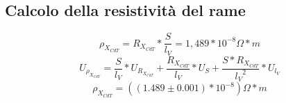 \documentclass[a4paper]{article}
\begin{document}
\subsection{Calcolo della resistività del rame}
\begin{Large} 
	\begin{equation}
		\rho_{X_{CdT}} = R_{X_{CdT}}*\frac{S}{l_V} = 1,489*10^{-8} \Omega*m
	 \end{equation}
	 \begin{equation}
		U_{\rho_{X_{CdT}}} = \frac{S}{l_V}*U_{R_{X_{CdT}}}+\frac{R_{X_{CdT}}}{l_V}*U_S+\frac{S*R_{X_{CdT}}}{{l_V}^2}*U_{l_V}
	 \end{equation}
	 \begin{equation}
		\rho_{X_{CdT}} = ((1.489\pm 0.001)*10^{-8} )\Omega*m
	 \end{equation}
\end{Large}
\end{document}
